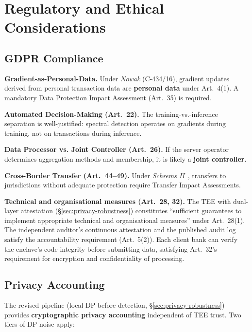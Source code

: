 \documentclass[10pt,journal]{IEEEtran}
\begin{document}
\section{Regulatory and Ethical Considerations}
\label{sec:regulatory}

\subsection{GDPR Compliance}

\textbf{Gradient-as-Personal-Data.} Under \emph{Nowak} (C-434/16), gradient updates derived from personal transaction data are \textbf{personal data} under Art.~4(1). A mandatory Data Protection Impact Assessment (Art.~35) is required.

\textbf{Automated Decision-Making (Art.~22).} The training-vs.-inference separation is well-justified: spectral detection operates on gradients during training, not on transactions during inference.

\textbf{Data Processor vs. Joint Controller (Art.~26).} If the server operator determines aggregation methods and membership, it is likely a \textbf{joint controller}.

\textbf{Cross-Border Transfer (Art.~44--49).} Under \emph{Schrems II}~\cite{schremsii2020}, transfers to jurisdictions without adequate protection require Transfer Impact Assessments.

\textbf{Technical and organisational measures (Art.~28, 32).} The TEE with dual-layer attestation (\S\ref{sec:privacy-robustness}) constitutes ``sufficient guarantees to implement appropriate technical and organisational measures'' under Art.~28(1). The independent auditor's continuous attestation and the published audit log satisfy the accountability requirement (Art.~5(2)). Each client bank can verify the enclave's code integrity before submitting data, satisfying Art.~32's requirement for encryption and confidentiality of processing.

\subsection{Privacy Accounting}
\label{sec:privacy-accounting}

The revised pipeline (local DP before detection, \S\ref{sec:privacy-robustness}) provides \textbf{cryptographic privacy accounting} independent of TEE trust. Two tiers of DP noise apply:
\end{document}
